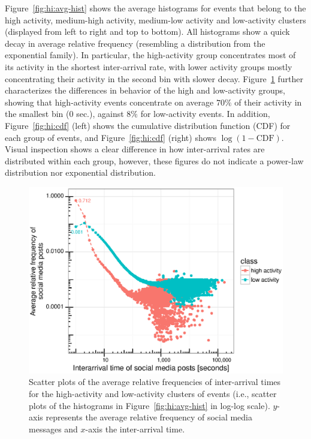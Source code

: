 Figure~\ref{fig:hi:avg-hist} shows the average histograms for events that belong
to the high activity, medium-high activity, medium-low activity and low-activity
clusters (displayed from left to right and top to bottom). 
%
All histograms show a quick decay in average relative frequency (resembling a
distribution from the exponential family). 
%
In particular, the high-activity group concentrates most of its activity in the
shortest inter-arrival rate, with lower activity groups mostly concentrating
their activity in the second bin with slower decay. 
%
Figure~\ref{fig:hi:scatter} further characterizes the differences in behavior of
the high and low-activity groups, showing that high-activity events concentrate
on average $70\%$ of their activity in the smallest bin ($0$ sec.), against
$8\%$ for low-activity events. 
%
In addition, Figure~\ref{fig:hi:cdf} (left) shows the cumulative distribution
function (CDF) for each group of events, and Figure~\ref{fig:hi:cdf} (right)
shows $\log{(1 - \mathrm{CDF})}$. 
%
Visual inspection shows a clear difference in how inter-arrival rates are
distributed within each group, however, these figures do not indicate a
power-law distribution nor exponential distribution.%

\begin{figure}[!htb]
  \centering
    \includegraphics[width=\textwidth]{figures/high-activity/fig5}
  \caption[Relative frequencies of inter-arrival times]{Scatter plots of the
average relative frequencies of inter-arrival times for the high-activity and
low-activity clusters of events (i.e., scatter plots of the histograms in
Figure~\ref{fig:hi:avg-hist} in log-log scale). $y$-axis represents the average
relative frequency of social media messages and $x$-axis the inter-arrival time.}
\label{fig:hi:scatter}
\end{figure}

